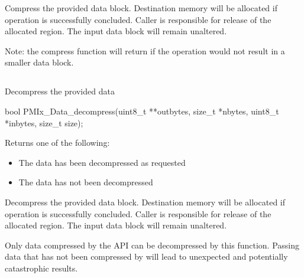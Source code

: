Compress the provided data block. Destination memory
will be allocated if operation is successfully concluded. Caller
is responsible for release of the allocated region. The input
data block will remain unaltered.

Note: the compress function will return  if the operation
would not result in a smaller data block.



\subsection{}

\summary

Decompress the provided data

\format

\cspecificstart
\begin{codepar}
bool
PMIx_Data_decompress(uint8_t **outbytes, size_t *nbytes,
                     uint8_t *inbytes, size_t size);
\end{codepar}
\cspecificend

\begin{arglist}
\end{arglist}

Returns one of the following:
\begin{itemize}
\item {} The data has been decompressed as requested
\item {} The data has not been decompressed
\end{itemize}

\descr

Decompress the provided data block. Destination memory
will be allocated if operation is successfully concluded. Caller
is responsible for release of the allocated region. The input
data block will remain unaltered.

Only data compressed by the  \ac{API}
can be decompressed by this function. Passing data that has not
been compressed by  will lead to
unexpected and potentially catastrophic results.

